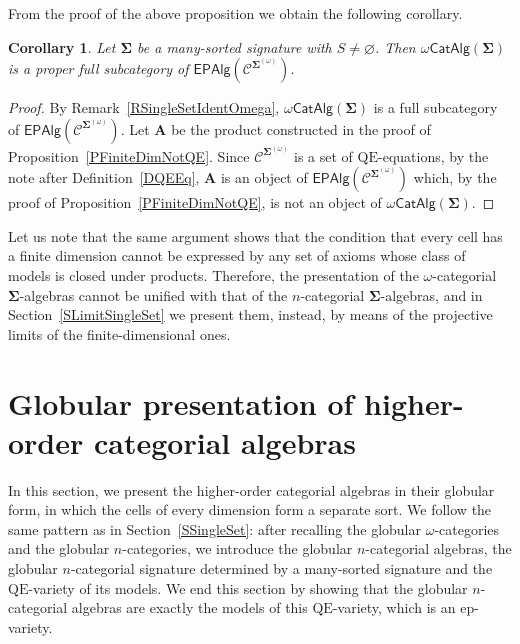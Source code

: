 \documentclass[a4paper, reqno
]{amsart}
\newcommand{\sig}[1]{\mathbf{#1}}             %
\newcommand{\spec}[1]{\boldsymbol{\mathcal{#1}}} %
\newcommand{\QE}{\mathrm{QE}}
\theoremstyle{plain}
\newtheorem{corollary}[theorem]{Corollary}
\theoremstyle{definition}
\begin{document}
From the proof of the above proposition we obtain the following corollary.

\begin{corollary}\label{CFiniteDimNotQE}
Let $\sig{\Sigma}$ be a many-sorted signature with $S\neq\varnothing$.
Then $\omega\mathsf{CatAlg}(\sig{\Sigma})$ is a proper full subcategory of $\mathsf{EPAlg}(\spec{C}^{\sig{\Sigma}^{(\omega)}})$.
\end{corollary}
\begin{proof}
By Remark~\ref{RSingleSetIdentOmega}, $\omega\mathsf{CatAlg}(\sig{\Sigma})$ is a full subcategory of $\mathsf{EPAlg}(\spec{C}^{\sig{\Sigma}^{(\omega)}})$.
Let $\mathbf{A}$ be the product constructed in the proof of Proposition~\ref{PFiniteDimNotQE}.
Since $\mathcal{C}^{\sig{\Sigma}^{(\omega)}}$ is a set of $\QE$-equations, by the note after Definition~\ref{DQEEq}, $\mathbf{A}$ is an object of $\mathsf{EPAlg}(\spec{C}^{\sig{\Sigma}^{(\omega)}})$ which, by the proof of Proposition~\ref{PFiniteDimNotQE}, is not an object of $\omega\mathsf{CatAlg}(\sig{\Sigma})$.
\end{proof}

Let us note that the same argument shows that the condition that every cell has a finite dimension cannot be expressed by any set of axioms whose class of models is closed under products.
Therefore, the presentation of the $\omega$-categorial $\sig{\Sigma}$-algebras cannot be unified with that of the $n$-categorial $\sig{\Sigma}$-algebras, and in Section~\ref{SLimitSingleSet} we present them, instead, by means of the projective limits of the finite-dimensional ones.

\section{Globular presentation of higher-order categorial algebras}\label{SGlobular}

In this section, we present the higher-order categorial algebras in their globular form, in which the cells of every dimension form a separate sort.
We follow the same pattern as in Section~\ref{SSingleSet}: after recalling the globular $\omega$-categories and the globular $n$-categories, we introduce the globular $n$-categorial algebras, the globular $n$-categorial signature determined by a many-sorted signature and the $\QE$-variety of its models.
We end this section by showing that the globular $n$-categorial algebras are exactly the models of this $\QE$-variety, which is an ep-variety.
\end{document}
